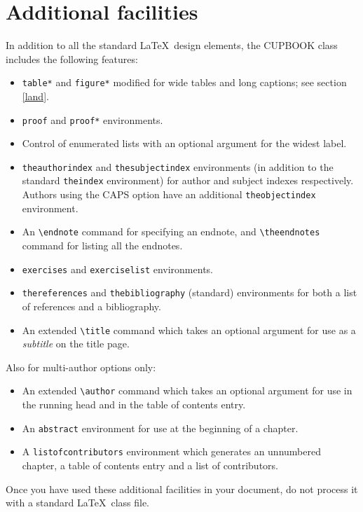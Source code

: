 \documentclass[cup6a]{cupbook}
\begin{document}
\section{Additional facilities}

In addition to all the standard \LaTeX\ design elements, the CUPBOOK
class includes the following features:
 \begin{itemize}\listsize
  \item \verb"table*" and \verb"figure*" modified for wide tables and
        long captions; see section \ref{land}.
  \item \verb"proof" and \verb"proof*" environments.
  \item Control of enumerated lists with an optional argument for the
        widest label.
  \item \verb"theauthorindex" and \verb"thesubjectindex" environments
        (in addition to the standard \verb"theindex" environment) for
        author and subject indexes respectively. Authors using the CAPS
        option have an additional \verb"theobjectindex" environment.
  \item An \verb"\endnote" command for specifying an endnote,
        and \verb"\theendnotes" command for listing all the endnotes.
  \item \verb"exercises" and \verb"exerciselist" environments.
  \item \verb"thereferences" and \verb"thebibliography" (standard)
        environments for both a list of references and a bibliography.
  \item An extended \verb"\title" command which takes an optional argument
        for use as a \emph{subtitle} on the title page.
 \end{itemize}
 Also for multi-author options only:
 \begin{itemize}\listsize
  \item An extended \verb"\author" command
        which takes an optional argument for use in the running head
        and in the table of contents entry.
  \item An \verb"abstract" environment for use at the beginning of a chapter.
  \item A \verb"listofcontributors" environment which generates an unnumbered
        chapter, a table of contents entry and a list of contributors.
 \end{itemize}
 Once you have used these additional facilities in your document,
do not process it with a standard \LaTeX\ class file.
\end{document}

